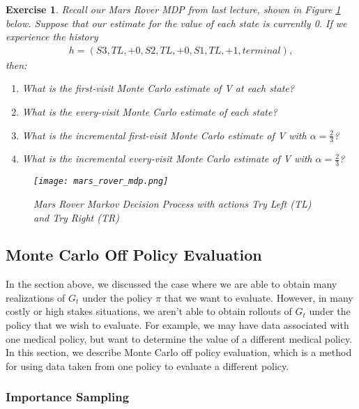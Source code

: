 \documentclass{article}
\newtheorem{exercise}{Exercise}[section]
\begin{document}
\begin{exercise}
Recall our Mars Rover MDP from last lecture, shown in Figure \ref{fig:mars_rover_mdp} below.  Suppose that our estimate for the value of each state is currently 0.  If we experience the history
\begin{align*}
h = (S3, TL, +0, S2, TL, +0, S1, TL, +1, terminal),
\end{align*}
then:
\begin{enumerate}[noitemsep,partopsep=0pt,topsep=0pt,parsep=0pt]
	\item What is the first-visit Monte Carlo estimate of V at each state?
	\item What is the every-visit Monte Carlo estimate of each state?
	\item What is the incremental first-visit Monte Carlo estimate of V with $\alpha = \frac{2}{3}$?
	\item What is the incremental every-visit Monte Carlo estimate of V with $\alpha = \frac{2}{3}$?
\end{enumerate}

\begin{figure}
    \centering
    \texttt{[image: mars\_rover\_mdp.png]}
    \caption{Mars Rover Markov Decision Process with actions Try Left (TL) and Try Right (TR)}    \label{fig:mars_rover_mdp}
\end{figure}
\end{exercise}


\subsection{Monte Carlo Off Policy Evaluation}

In the section above, we discussed the case where we are able to obtain many realizations of $G_t$ under the policy $\pi$ that we want to evaluate.  However, in many costly or high stakes situations, we aren't able to obtain rollouts of $G_t$ under the policy that we wish to evaluate.  For example, we may have data associated with one medical policy, but want to determine the value of a different medical policy.  In this section, we describe Monte Carlo off policy evaluation, which is a method for using data taken from one policy to evaluate a different policy.

\subsubsection{Importance Sampling}
\end{document}

